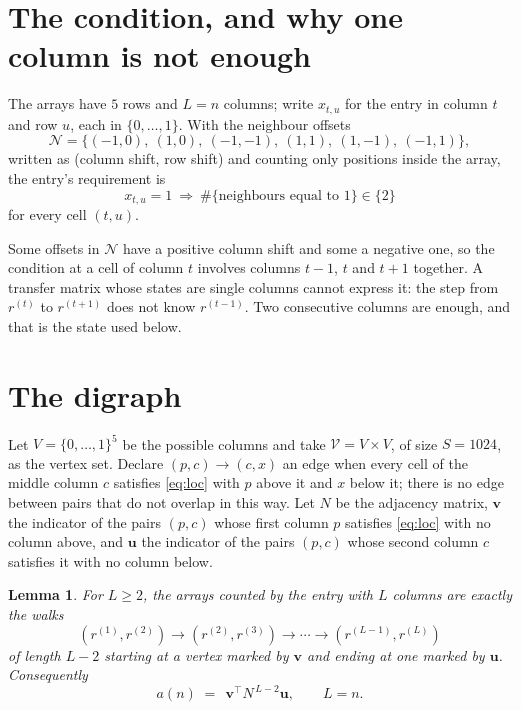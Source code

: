 \documentclass[11pt,a4paper]{article}
\theoremstyle{plain}
\newtheorem{lemma}[theorem]{Lemma}
\theoremstyle{definition}
\begin{document}
\section{The condition, and why one column is not enough}

The arrays have $5$ rows and $L=n$ columns; write $x_{t,u}$ for the entry in
column $t$ and row $u$, each in $\{0,\dots,1\}$. With the neighbour offsets
\[
\mathcal N=\{(-1,0),\ (1,0),\ (-1,-1),\ (1,1),\ (1,-1),\ (-1,1)\},
\]
written as (column shift, row shift) and counting only positions inside the array, the
entry's requirement is
\begin{equation}\label{eq:loc}
x_{t,u}=1\ \Rightarrow\ \#\{\text{neighbours equal to }1\}\in\{2\}
\end{equation}
for every cell $(t,u)$.

Some offsets in $\mathcal N$ have a positive column shift and some a negative one, so the
condition at a cell of column $t$ involves columns $t-1$, $t$ and $t+1$ together. A transfer
matrix whose states are single columns cannot express it: the step from $r^{(t)}$ to
$r^{(t+1)}$ does not know $r^{(t-1)}$. Two consecutive columns are enough, and that is
the state used below.

\section{The digraph}

Let $V=\{0,\dots,1\}^{5}$ be the possible columns and take
$\mathcal V=V\times V$, of size $S=1024$, as the vertex set. Declare $(p,c)\to(c,x)$ an edge
when every cell of the middle column $c$ satisfies \eqref{eq:loc} with $p$ above it and $x$
below it; there is no edge between pairs that do not overlap in this way. Let $N$ be the
adjacency matrix, $\mathbf{v}$ the indicator of the pairs $(p,c)$ whose first column $p$
satisfies \eqref{eq:loc} with no column above, and $\mathbf{u}$ the indicator of
the pairs $(p,c)$ whose second column $c$ satisfies it with no column below.

\begin{lemma}\label{lem:walk}
For $L\ge2$, the arrays counted by the entry with $L$ columns are exactly the walks
\[
(r^{(1)},r^{(2)})\to(r^{(2)},r^{(3)})\to\cdots\to(r^{(L-1)},r^{(L)})
\]
of length $L-2$ starting at a vertex marked by $\mathbf{v}$ and ending at one marked by
$\mathbf{u}$. Consequently
\[
a(n)\;=\;\,\mathbf{v}^{\!\top}N^{\,L-2}\mathbf{u},\qquad L=n .
\]
\end{lemma}
\end{document}
